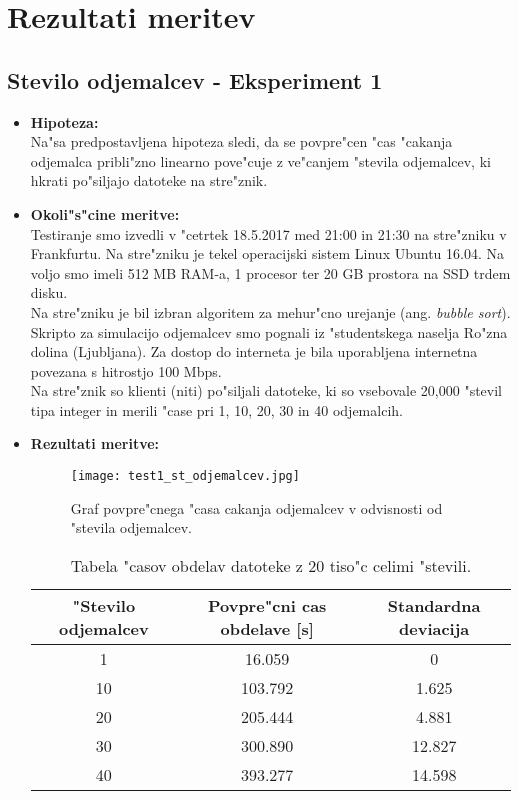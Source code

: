 \newpage
\section{Rezultati meritev}


\subsection{Stevilo odjemalcev - Eksperiment 1}
\begin{itemize}
	\item \textbf{Hipoteza: }  \\
		Na"sa predpostavljena hipoteza sledi, da se povpre"cen "cas "cakanja odjemalca pribli"zno linearno pove"cuje z ve"canjem "stevila odjemalcev, ki hkrati po"siljajo datoteke na stre"znik.
			
	\item \textbf{Okoli"s"cine meritve: } \\
		Testiranje smo izvedli v "cetrtek 18.5.2017 med 21:00 in 21:30 na stre"zniku v Frankfurtu. Na stre"zniku je tekel operacijski sistem Linux Ubuntu 16.04. Na voljo smo imeli 512 MB RAM-a, 1 procesor ter 20 GB prostora na SSD trdem disku.\\Na stre"zniku je bil izbran algoritem za mehur"cno urejanje (ang. \textit{bubble sort}). Skripto za simulacijo odjemalcev smo pognali iz "studentskega naselja Ro"zna dolina (Ljubljana). Za dostop do interneta je bila uporabljena internetna povezana s hitrostjo 100 Mbps.\\ Na stre"znik so klienti (niti) po"siljali datoteke, ki so vsebovale 20,000 "stevil tipa integer in merili "case pri 1, 10, 20, 30 in 40 odjemalcih.

 	\item \textbf{Rezultati meritve: }  \\
		
	\begin{figure}[!htb]
  	\centering
  	  \texttt{[image: test1\_st\_odjemalcev.jpg]}
  	\caption{Graf povpre"cnega "casa cakanja odjemalcev v odvisnosti od "stevila odjemalcev.}
  	\label{8_graf_1_rez}
	\end{figure}

	\begin{table}[!htbp]
  	\centering
  	\begin{tabular}{ | c | c | c | }
    	\hline
    	"Stevilo odjemalcev & Povpre"cni cas obdelave [s] & Standardna deviacija\\ \hline
    	1 & 16.059     & 0 \\ \hline
    	10 & 103.792 & 1.625\\ \hline
    	20 & 205.444 & 4.881\\ \hline
    	30 & 300.890 & 12.827\\ \hline
    	40 & 393.277 & 14.598\\ \hline
  	\end{tabular}
  	\caption{Tabela "casov obdelav datoteke z 20 tiso"c celimi "stevili.}
  	\label{8_table2}
  	\centering
	\end{table}


\end{itemize}
